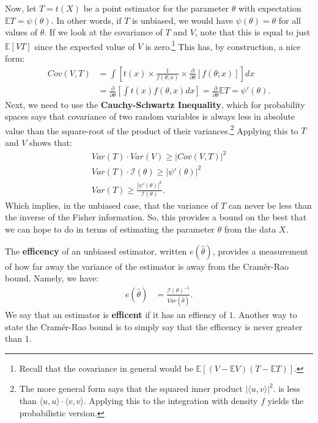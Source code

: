 \documentclass{tufte-handout}
\begin{document}
Now, let $T = t(X)$ be a point estimator for the parameter $\theta$ with
expectation $\mathbb{E}T = \psi(\theta)$. In other words, if $T$ is
unbiased, we would have $\psi(\theta) = \theta$ for all values of 
$\theta$. If we look at the covariance of $T$ and $V$, note that this
is equal to just $\mathbb{E}[VT]$ since the expected value of $V$ is zero.\footnote{
  Recall that the covariance in general would be $\mathbb{E}[(V - \mathbb{E}V)(T - \mathbb{E}T)]$.
} This has, by construction, a nice form:
\begin{align*}
Cov(V, T) &= \int \left[ t(x) \times \frac{1}{f(\theta; x)} \times \frac{\partial}{\partial \theta} \left[ f(\theta; x) \right] \right] dx \\
&= \frac{\partial}{\partial \theta} \left[ \int t(x) f(\theta, x) dx \right] = \frac{\partial}{\partial \theta} \mathbb{E}T = \psi'(\theta).
\end{align*}
Next, we need to use the \textbf{Cauchy-Schwartz Inequality}, which for
probability spaces says that covariance of two random variables is always
less in absolute value than the square-root of the product of their
variances.\footnote{
  The more general form says that the squared inner product $| \langle u, v\rangle |^2$.
  is less than $\langle u, u\rangle \cdot \langle v, v\rangle$. Applying this to
  the integration with density $f$ yields the probabilistic version.
} Applying this to $T$ and $V$ shows that:
\begin{align*}
Var(T) \cdot Var(V) \geq | Cov(V, T) |^2  \\
Var(T) \cdot \mathcal{I}(\theta) \geq | \psi'(\theta) |^2  \\
Var(T) \geq \frac{| \psi'(\theta) |^2}{\mathcal{I}(\theta)}.
\end{align*}
Which implies, in the unbiased case, that the variance of $T$ can never be
less than the inverse of the Fisher information. So, this provides a bound
on the best that we can hope to do in terms of estimating the parameter 
$\theta$ from the data $X$.

The \textbf{efficency} of an unbiased estimator, written $e(\widehat{\theta})$, 
provides a measurement of how far away the variance of the estimator is 
away from the Cramèr-Rao bound. Namely, we have:
\begin{align*}
e(\widehat{\theta}) &= \frac{\mathcal{I}(\theta)^{-1}}{Var(\widehat{\theta})}.
\end{align*}
We say that an estimator is \textbf{efficent} if it has an effiency of $1$.
Another way to state the Cramér-Rao bound is to simply say that the efficency
is never greater than $1$.
\end{document}
